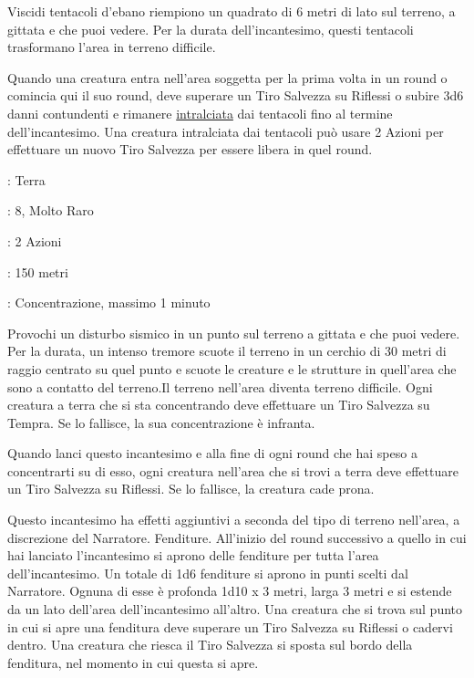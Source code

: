\begin{multicols}{2}
Viscidi tentacoli d'ebano riempiono un quadrato di 6 metri di lato sul terreno, a gittata e che puoi vedere. Per la durata dell'incantesimo, questi tentacoli trasformano l'area in terreno difficile.

Quando una creatura entra nell'area soggetta per la prima volta in un round o comincia qui il suo round, deve superare un Tiro Salvezza su Riflessi o subire 3d6 danni contundenti e rimanere \hyperlink{intralciato}{intralciata} dai tentacoli fino al termine dell'incantesimo. Una creatura intralciata dai tentacoli può usare 2 Azioni per effettuare un nuovo Tiro Salvezza per essere libera in quel round.

\noindent\colorbox{OBSSgold!10}{
\begin{minipage}{0.95\linewidth}
\begin{description}[noitemsep, topsep=0pt, parsep=0pt, partopsep=0pt, leftmargin=0cm, labelwidth=1.3cm]
	\item[\textbf{Lista}]: Terra
	\item[\textbf{Livello}]: 8, Molto Raro
	\item[\textbf{Lancio}]: 2 Azioni
	\item[\textbf{Gittata}]: 150 metri
	\item[\textbf{Durata}]: Concentrazione, massimo 1 minuto
\end{description}
\end{minipage}}\smallskip

Provochi un disturbo sismico in un punto sul terreno a gittata e che puoi vedere. Per la durata, un intenso tremore scuote il terreno in un cerchio di 30 metri di raggio centrato su quel punto e scuote le creature e le strutture in quell'area che sono a contatto del terreno.Il terreno nell'area diventa terreno difficile. Ogni creatura a terra che si sta concentrando deve effettuare un Tiro Salvezza su Tempra. Se lo fallisce, la sua concentrazione è infranta.

Quando lanci questo incantesimo e alla fine di ogni round che hai speso a concentrarti su di esso, ogni creatura nell'area che si trovi a terra deve effettuare un Tiro Salvezza su Riflessi. Se lo fallisce, la creatura cade prona.

Questo incantesimo ha effetti aggiuntivi a seconda del tipo di terreno nell'area, a discrezione del Narratore. Fenditure. All'inizio del round successivo a quello in cui hai lanciato l'incantesimo si aprono delle fenditure per tutta l'area dell'incantesimo. Un totale di 1d6 fenditure si aprono in punti scelti dal Narratore. Ognuna di esse è profonda 1d10 x 3 metri, larga 3 metri e si estende da un lato dell'area dell'incantesimo all'altro. Una creatura che si trova sul punto in cui si apre una fenditura deve superare un Tiro Salvezza su Riflessi o cadervi dentro. Una creatura che riesca il Tiro Salvezza si sposta sul bordo della fenditura, nel momento in cui questa si apre.


\end{multicols}
